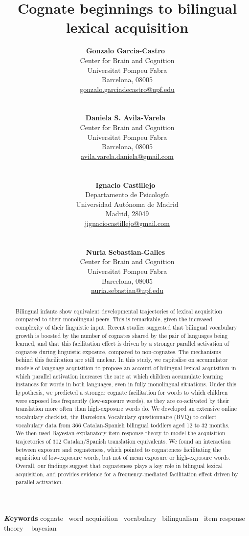 \documentclass[
]{article}
\title{Cognate beginnings to bilingual lexical acquisition}
\author{
\textbf{Gonzalo Garcia-Castro}~\orcidlink{0000-0002-8553-4209}\\Center
for Brain and Cognition\\Universitat Pompeu Fabra\\Barcelona,
08005\\\href{mailto:gonzalo.garciadecastro@upf.edu}{gonzalo.garciadecastro@upf.edu}\\\\\\
\textbf{Daniela S. Avila-Varela}~\orcidlink{0000-0002-3518-8117}\\Center
for Brain and Cognition\\Universitat Pompeu Fabra\\Barcelona,
08005\\\href{mailto:avila.varela.daniela@gmail.com}{avila.varela.daniela@gmail.com}\\\\\\
\textbf{Ignacio
Castillejo}~\orcidlink{0000-0001-7445-0416}\\Departamento de
Psicología\\Universidad Autónoma de Madrid\\Madrid,
28049\\\href{mailto:jignaciocastillejo@gmail.com}{jignaciocastillejo@gmail.com}\\\\\\
\textbf{Nuria Sebastian-Galles}~\orcidlink{0000-0001-6938-2498}\\Center
for Brain and Cognition\\Universitat Pompeu Fabra\\Barcelona,
08005\\\href{mailto:nuria.sebastian@upf.edu}{nuria.sebastian@upf.edu}}
\date{}
\begin{document}
\maketitle
\begin{abstract}
Bilingual infants show equivalent developmental trajectories of lexical
acquisition compared to their monolingual peers. This is remarkable,
given the increased complexity of their linguistic input. Recent studies
suggested that bilingual vocabulary growth is boosted by the number of
cognates shared by the pair of languages being learned, and that this
facilitation effect is driven by a stronger parallel activation of
cognates during linguistic exposure, compared to non-cognates. The
mechanisms behind this facilitation are still unclear. In this study, we
capitalise on accumulator models of language acquisition to propose an
account of bilingual lexical acquisition in which parallel activation
increases the rate at which children accumulate learning instances for
words in both languages, even in fully monolingual situations. Under
this hypothesis, we predicted a stronger cognate facilitation for words
to which children were exposed less frequently (low-exposure words), as
they are co-activated by their translation more often than high-exposure
words do. We developed an extensive online vocabulary checklist, the
Barcelona Vocabulary questionnaire (BVQ) to collect vocabulary data from
366 Catalan-Spanish bilingual toddlers aged 12 to 32 months. We then
used Bayesian explanatory item response theory to model the acquisition
trajectories of 302 Catalan/Spanish translation equivalents. We found an
interaction between exposure and cognateness, which pointed to
cognateness facilitating the aquisition of low-exposure words, but not
of mean exposure or high-exposure words. Overall, our findings suggest
that cognateness plays a key role in bilingual lexical acquisition, and
provides evidence for a frequency-mediated facilitation effect driven by
parallel activation.
\end{abstract}
{\bfseries \emph Keywords}
\def\sep{\textbullet\ }
cognate \sep word
acquisition \sep vocabulary \sep bilingualism \sep item response
theory \sep 
bayesian

\ifdefined\Shaded\renewenvironment{Shaded}{\begin{tcolorbox}[interior hidden, borderline west={3pt}{0pt}{shadecolor}, breakable, enhanced, frame hidden, sharp corners, boxrule=0pt]}{\end{tcolorbox}}\fi
\end{document}
